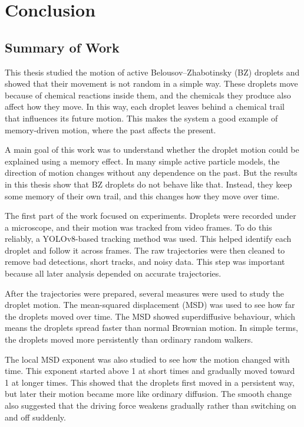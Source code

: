 
\chapter{Conclusion}
\label{chap:conclusion}

\section{Summary of Work}
\label{sec:summary}

This thesis studied the motion of active Belousov--Zhabotinsky (BZ) droplets and showed that their movement is not random in a simple way. These droplets move because of chemical reactions inside them, and the chemicals they produce also affect how they move. In this way, each droplet leaves behind a chemical trail that influences its future motion. This makes the system a good example of memory-driven motion, where the past affects the present.

A main goal of this work was to understand whether the droplet motion could be explained using a memory effect. In many simple active particle models, the direction of motion changes without any dependence on the past. But the results in this thesis show that BZ droplets do not behave like that. Instead, they keep some memory of their own trail, and this changes how they move over time.

The first part of the work focused on experiments. Droplets were recorded under a microscope, and their motion was tracked from video frames. To do this reliably, a YOLOv8-based tracking method was used. This helped identify each droplet and follow it across frames. The raw trajectories were then cleaned to remove bad detections, short tracks, and noisy data. This step was important because all later analysis depended on accurate trajectories.

After the trajectories were prepared, several measures were used to study the droplet motion. The mean-squared displacement (MSD) was used to see how far the droplets moved over time. The MSD showed superdiffusive behaviour, which means the droplets spread faster than normal Brownian motion. In simple terms, the droplets moved more persistently than ordinary random walkers.

The local MSD exponent was also studied to see how the motion changed with time. This exponent started above 1 at short times and gradually moved toward 1 at longer times. This showed that the droplets first moved in a persistent way, but later their motion became more like ordinary diffusion. The smooth change also suggested that the driving force weakens gradually rather than switching on and off suddenly.

